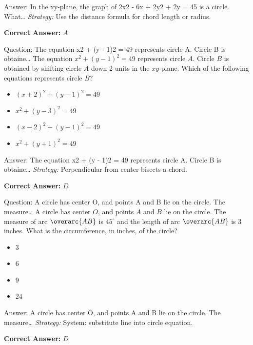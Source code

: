 \documentclass{beamer}
\begin{document}
\begin{frame}{Answer: In the xy-plane, the graph of 2x2 - 6x + 2y2 + 2y = 45 is a circle. What…}
\textit{Strategy:} Use the distance formula for chord length or radius.

\textbf{Correct Answer:} \( \boxed{A} \)

\end{frame}
\begin{frame}{Question: The equation x2 + (y - 1)2 = 49 represents circle A. Circle B is obtaine…}
The equation $x^2 + (y - 1)^2 = 49$ represents circle $A$. Circle $B$ is obtained by shifting circle $A$ down 2 units in the $xy$-plane. Which of the following equations represents circle $B$?
\begin{itemize}
    \item[\textbf{A.}] $(x + 2)^2 + (y - 1)^2 = 49$
    \item[\textbf{B.}] $x^2 + (y - 3)^2 = 49$
    \item[\textbf{C.}] $(x - 2)^2 + (y - 1)^2 = 49$
    \item[\textbf{D.}] $x^2 + (y + 1)^2 = 49$
\end{itemize}
\end{frame}
\begin{frame}{Answer: The equation x2 + (y - 1)2 = 49 represents circle A. Circle B is obtaine…}
\textit{Strategy:} Perpendicular from center bisects a chord.

\textbf{Correct Answer:} \( \boxed{D} \)

\end{frame}
\begin{frame}{Question: A circle has center O, and points A and B lie on the circle. The measure…}
A circle has center $O$, and points $A$ and $B$ lie on the circle. The measure of arc $\overarc{AB}$ is $45^\circ$ and the length of arc $\overarc{AB}$ is $3$ inches. What is the circumference, in inches, of the circle?
\begin{itemize}
    \item[\textbf{A.}] $3$
    \item[\textbf{B.}] $6$
    \item[\textbf{C.}] $9$
    \item[\textbf{D.}] $24$
\end{itemize}
\end{frame}
\begin{frame}{Answer: A circle has center O, and points A and B lie on the circle. The measure…}
\textit{Strategy:} System: substitute line into circle equation.

\textbf{Correct Answer:} \( \boxed{D} \)

\end{frame}
\end{document}
